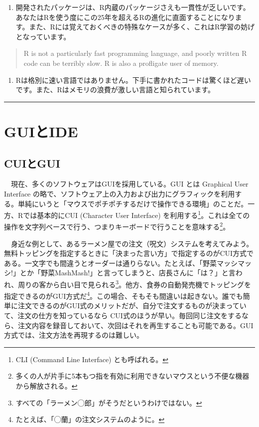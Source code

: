 \documentclass[
  a4paper,
  pandoc,
  ja=standard,
  jafont=haranoaji]{bxjsbook}
\providecommand{\tightlist}{%
  \setlength{\itemsep}{0pt}\setlength{\parskip}{0pt}}
\begin{document}
\begin{enumerate}
\def\labelenumi{\arabic{enumi}.}
\setcounter{enumi}{3}
\tightlist
\item
  開発されたパッケージは、R内蔵のパッケージさえも一貫性が乏しいです。あなたはRを使う度にこの25年を超えるRの進化に直面することになります。また、Rには覚えておくべきの特殊なケースが多く、これはR学習の妨げとなっています。
\end{enumerate}

\begin{quote}
R is not a particularly fast programming language, and poorly written R
code can be terribly slow. R is also a profligate user of memory.
\end{quote}

\begin{enumerate}
\def\labelenumi{\arabic{enumi}.}
\setcounter{enumi}{4}
\tightlist
\item
  Rは格別に速い言語ではありません。下手に書かれたコードは驚くほど遅いです。また、Rはメモリの浪費が激しい言語と知られています。
\end{enumerate}

\begin{center}\rule{0.5\linewidth}{0.5pt}\end{center}

\hypertarget{GUI_IDE}{%
\section{GUIとIDE}\label{GUI_IDE}}

\hypertarget{cuiux3068gui}{%
\subsection{CUIとGUI}\label{cuiux3068gui}}

　現在、多くのソフトウェアはGUIを採用している。GUI とは Graphical User
Interface
の略で、ソフトウェア上の入力および出力にグラフィックを利用する。単純にいうと「マウスでポチポチするだけで操作できる環境」のことだ。一方、Rでは基本的にCUI
(Character User Interface)
を利用する\footnote{CLI (Command Line Interface) とも呼ばれる。}。これは全ての操作を文字列ベースで行う、つまりキーボードで行うことを意味する\footnote{多くの人が片手に5本もつ指を有効に利用できないマウスという不便な機器から解放される。}。

　身近な例として、あるラーメン屋での注文（呪文）システムを考えてみよう。無料トッピングを指定するときに「決まった言い方」で指定するのがCUI方式である。一文字でも間違うとオーダーは通りらない。たとえば、「野菜マッシマッシ!」とか「野菜MashMash!」と言ってしまうと、店長さんに「は？」と言われ、周りの客から白い目で見られる\footnote{すべての「ラーメン◯郎」がそうだというわけではない。}。他方、食券の自動発売機でトッピングを指定できるのがGUI方式だ\footnote{たとえば、「◯蘭」の注文システムのように。}。この場合、そもそも間違いは起きない。誰でも簡単に注文できるのがGUI式のメリットだが、自分で注文するものが決まっていて、注文の仕方を知っているなら
CUI式のほうが早い。毎回同じ注文をするなら、注文内容を録音しておいて、次回はそれを再生することも可能である。GUI方式では、注文方法を再現するのは難しい。
\end{document}
